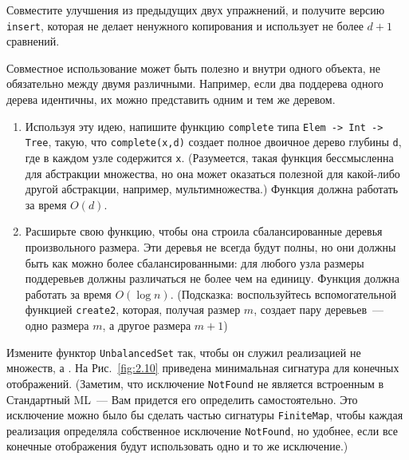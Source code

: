\ifanswers
\begin{frame}
\begin{exercise}\label{ex:2.4}
  Совместите улучшения из предыдущих двух упражнений, и получите
  версию \lstinline{insert}, которая не делает ненужного копирования и
  использует не более $d+1$ сравнений.
\end{exercise}
\end{frame}

\begin{frame}
\begin{exercise}\label{ex:2.5}
  Совместное использование может быть полезно и внутри одного объекта, не
  обязательно между двумя различными.  Например, если два поддерева
  одного дерева идентичны, их можно представить одним и тем же
  деревом.
  \begin{enumerate}
    \item Используя эту идею, напишите функцию \lstinline{complete} типа
    \texttt{Elem -> Int -> Tree}, такую, что
    \texttt{complete(x,d)} создает полное двоичное дерево глубины
    \lstinline{d}, где в каждом узле содержится \lstinline{x}.
    (Разумеется, такая функция бессмысленна для абстракции множества,
    но она может оказаться полезной для какой-либо другой абстракции,
    например, мультимножества.) Функция должна работать за время $O(d)$.
    \item Расширьте свою функцию, чтобы она строила сбалансированные
    деревья произвольного размера. Эти деревья не всегда будут полны,
    но они должны быть как можно более сбалансированными: для любого
    узла размеры поддеревьев должны различаться не более чем на
    единицу. Функция должна работать за время $O(\log n)$. (Подсказка:
    воспользуйтесь вспомогательной функцией \lstinline{create2},
    которая, получая размер $m$, создает пару деревьев~--- одно размера
    $m$, а другое размера $m+1$)
  \end{enumerate}
\end{exercise}
\end{frame}


\begin{frame}
\begin{exercise}\label{ex:2.6}
  Измените функтор \texttt{UnbalancedSet} так, чтобы он служил
  реализацией не множеств, а . На
  Рис.~\ref{fig:2.10} приведена минимальная сигнатура для конечных
  отображений. (Заметим, что исключение \texttt{NotFound} не
  является встроенным в Стандартный ML~--- Вам придется его определить
  самостоятельно. Это исключение можно было бы сделать частью
  сигнатуры \texttt{FiniteMap},  чтобы каждая реализация
  определяла собственное исключение \texttt{NotFound}, но удобнее,
  если все конечные отображения будут использовать одно и то же
  исключение.)
\end{exercise}
\end{frame}
\fi 

